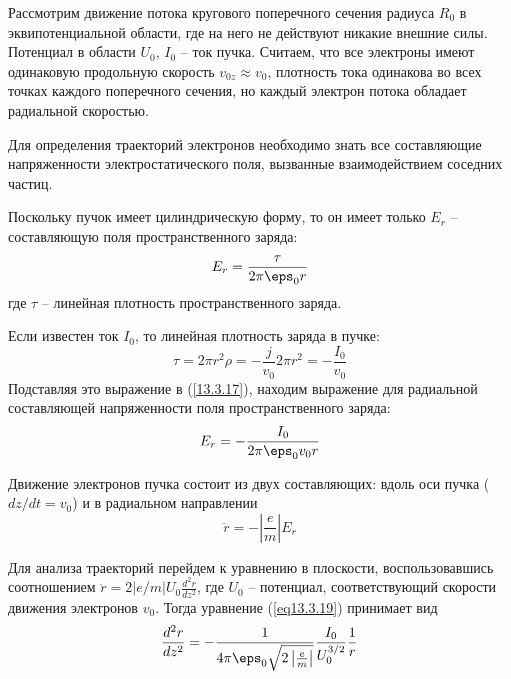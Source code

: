 
Рассмотрим движение потока кругового поперечного сечения радиуса \( R_0 \) в 
эквипотенциальной области, где на него не действуют никакие внешние силы. 
Потенциал в области \( U_0 \), \( I_0 \) -- ток пучка. Считаем, что все 
электроны имеют одинаковую продольную скорость \( v_{0z} \approx v_0 \), 
плотность тока одинакова во всех точках каждого поперечного сечения, но каждый 
электрон потока обладает радиальной скоростью.

Для определения траекторий электронов необходимо знать все составляющие 
напряженности электростатического поля, вызванные взаимодействием соседних частиц.

Поскольку пучок имеет цилиндрическую форму, то он имеет только \( E_r \) -- 
составляющую поля пространственного заряда:
\begin{equation}
	E_r = \frac{\tau}{2\pi\eps_0 r}
	\label{eq13.3.17}
\end{equation}
где \( \tau \) -- линейная плотность пространственного заряда.

Если известен ток \( I_0 \), то линейная плотность заряда в пучке:
\[
	\tau = 2\pi r^2 \rho = -\frac{j}{v_0}2\pi r^2 = -\frac{I_0}{v_0}
\]
Подставляя это выражение в (\ref{13.3.17}), находим выражение для радиальной 
составляющей напряженности поля пространственного заряда:
\begin{equation}
	E_r = -\frac{I_0}{2\pi\eps_0 v_0 r}
	\label{eq13.3.18}
\end{equation}
 
Движение электронов пучка состоит из двух составляющих: вдоль оси пучка 
(\( dz/dt = v_0\)) и в радиальном направлении
\begin{equation}
	\ddot{r} = -\left| \frac{e}{m} \right|E_r
	\label{eq13.3.19}
\end{equation}

Для анализа траекторий перейдем к уравнению в плоскости, воспользовавшись 
соотношением \( \ddot{r} = 2\left| e/m \right| U_0 \frac{d^2 r}{dz^2} \), где 
\( U_0 \) -- потенциал, соответствующий скорости движения электронов 
\( v_0 \). Тогда  уравнение (\ref{eq13.3.19}) принимает вид
\begin{equation}
	\frac{d^2 r}{dz^2} = 
		-\frac{1}{4\pi\eps_0 \sqrt{2\left|\frac{e}{m}\right|}}
		\frac{I_0}{U_0^{3/2}}\frac{1}{r}
	\label{eq13.3.20}
\end{equation}
 
